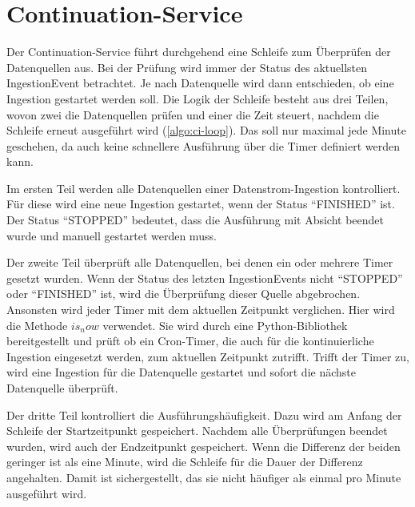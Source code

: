 \section{Continuation-Service}

Der Continuation-Service führt durchgehend eine Schleife zum Überprüfen der Datenquellen aus.
Bei der Prüfung wird immer der Status des aktuellsten IngestionEvent betrachtet.
Je nach Datenquelle wird dann entschieden, ob eine Ingestion gestartet werden soll.
Die Logik der Schleife besteht aus drei Teilen, wovon zwei die Datenquellen prüfen und einer die Zeit steuert, nachdem die Schleife erneut ausgeführt wird (\cref{algo:ci-loop}).
Das soll nur maximal jede Minute geschehen, da auch keine schnellere Ausführung über die Timer definiert werden kann.

Im ersten Teil werden alle Datenquellen einer Datenstrom-Ingestion kontrolliert.
Für diese wird eine neue Ingestion gestartet, wenn der Status "`FINISHED"' ist.
Der Status "`STOPPED"' bedeutet, dass die Ausführung mit Absicht beendet wurde und manuell gestartet werden muss.

Der zweite Teil überprüft alle Datenquellen, bei denen ein oder mehrere Timer gesetzt wurden.
Wenn der Status des letzten IngestionEvents nicht "`STOPPED"' oder "`FINISHED"' ist, wird die Überprüfung dieser Quelle abgebrochen.
Ansonsten wird jeder Timer mit dem aktuellen Zeitpunkt verglichen.
Hier wird die Methode $is_now$ verwendet.
Sie wird durch eine Python-Bibliothek bereitgestellt und prüft ob ein Cron-Timer, die auch für die kontinuierliche Ingestion eingesetzt werden, zum aktuellen Zeitpunkt zutrifft.
Trifft der Timer zu, wird eine Ingestion für die Datenquelle gestartet und sofort die nächste Datenquelle überprüft.

Der dritte Teil kontrolliert die Ausführungshäufigkeit.
Dazu wird am Anfang der Schleife der Startzeitpunkt gespeichert.
Nachdem alle Überprüfungen beendet wurden, wird auch der Endzeitpunkt gespeichert.
Wenn die Differenz der beiden geringer ist als eine Minute, wird die Schleife für die Dauer der Differenz angehalten.
Damit ist sichergestellt, das sie nicht häufiger als einmal pro Minute ausgeführt wird.

